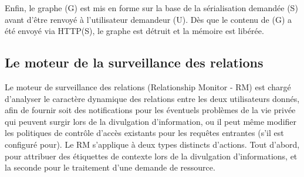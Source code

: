 \documentclass[a4paper]{article}
\begin{document}
Enfin, le graphe (G) est mis en forme sur la base de la sérialisation demandée (S) avant d'être renvoyé à l'utilisateur demandeur (U). Dès que le contenu de (G) a été envoyé via HTTP(S), le graphe est détruit et la mémoire est libérée.

\subsection{Le moteur de la surveillance des relations}
\label{subsec:rme}
Le moteur de surveillance des relations (Relationship Monitor - RM) est chargé d'analyser le caractère dynamique des relations entre les deux utilisateurs donnés, afin de fournir soit des notifications pour les éventuels problèmes de la vie privée qui peuvent surgir lors de la divulgation d'information, ou il peut même modifier les politiques de contrôle d'accès existants pour les requêtes entrantes (s'il est configuré pour). Le RM s'applique à deux types distincts d'actions. Tout d'abord, pour attribuer des étiquettes de contexte lors de la divulgation d'informations, et la seconde pour le traitement d'une demande de ressource.\\
\end{document}

